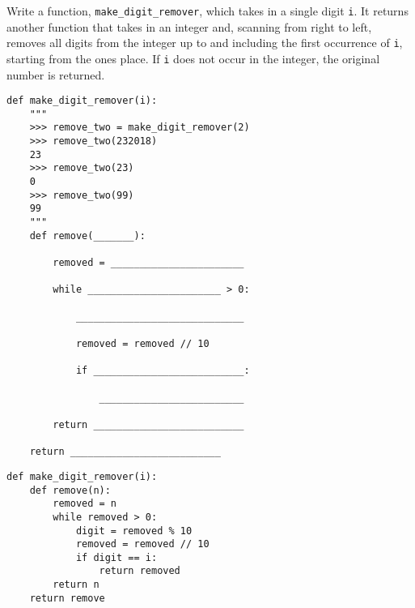 \begin{blocksection}
\question Write a function, \lstinline{make_digit_remover}, which takes in a single digit \texttt{i}. It returns another function that takes in an integer and, scanning from right to left, removes all digits from the integer up to and including the first occurrence of \texttt{i}, starting from the ones place. If \texttt{i} does not occur in the integer, the original number is returned. 

\begin{lstlisting}
def make_digit_remover(i):
    """
    >>> remove_two = make_digit_remover(2)
    >>> remove_two(232018)
    23
    >>> remove_two(23)
    0
    >>> remove_two(99)
    99
    """
    def remove(_______):

    	removed = _______________________

        while _______________________ > 0:

            _____________________________

            removed = removed // 10

            if __________________________:

                _________________________

        return __________________________

    return __________________________
\end{lstlisting}

\begin{solution}
\begin{lstlisting}
def make_digit_remover(i):
    def remove(n):
        removed = n
        while removed > 0:
            digit = removed % 10
            removed = removed // 10
            if digit == i:
                return removed
        return n
    return remove
\end{lstlisting}
\end{solution}
\end{blocksection}
